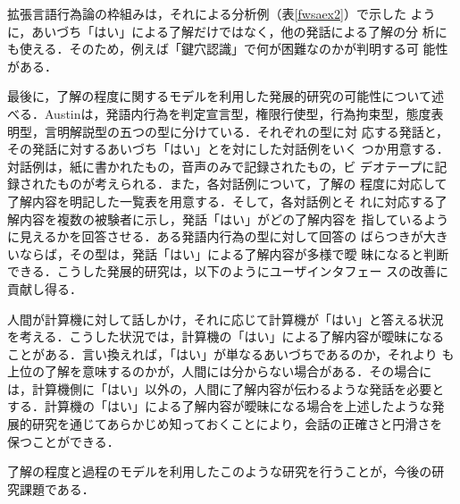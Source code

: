 拡張言語行為論の枠組みは，それによる分析例（表\ref{fwsaex2}）で示した
ように，あいづち「はい」による了解だけではなく，他の発話による了解の分
析にも使える．そのため，例えば「鍵穴認識」で何が困難なのかが判明する可
能性がある．


最後に，了解の程度に関するモデルを利用した発展的研究の可能性について述
べる．Austinは，発語内行為を判定宣言型，権限行使型，行為拘束型，態度表
明型，言明解説型の五つの型に分けている\cite{austin}．それぞれの型に対
応する発話と，その発話に対するあいづち「はい」とを対にした対話例をいく
つか用意する．対話例は，紙に書かれたもの，音声のみで記録されたもの，ビ
デオテープに記録されたものが考えられる．また，各対話例について，了解の
程度に対応して了解内容を明記した一覧表を用意する．そして，各対話例とそ
れに対応する了解内容を複数の被験者に示し，発話「はい」がどの了解内容を
指しているように見えるかを回答させる．ある発語内行為の型に対して回答の
ばらつきが大きいならば，その型は，発話「はい」による了解内容が多様で曖
昧になると判断できる．こうした発展的研究は，以下のようにユーザインタフェー
スの改善に貢献し得る．

人間が計算機に対して話しかけ，それに応じて計算機が「はい」と答える状況
を考える．こうした状況では，計算機の「はい」による了解内容が曖昧になる
ことがある．言い換えれば，「はい」が単なるあいづちであるのか，それより
も上位の了解を意味するのかが，人間には分からない場合がある．その場合に
は，計算機側に「はい」以外の，人間に了解内容が伝わるような発話を必要と
する．計算機の「はい」による了解内容が曖昧になる場合を上述したような発
展的研究を通じてあらかじめ知っておくことにより，会話の正確さと円滑さを
保つことができる．

了解の程度と過程のモデルを利用したこのような研究を行うことが，今後の研
究課題である．






\begin{biography}
\end{biography}


